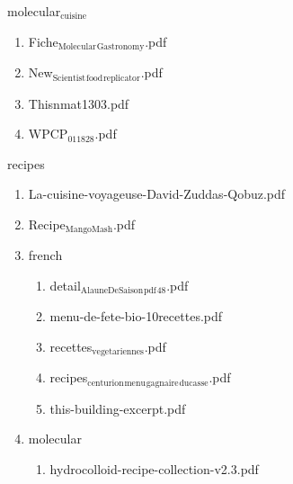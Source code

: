 \documentclass[11pt]{article}
\begin{document}
\item molecular$_{\text{cuisine}}$
\label{sec-1-1-1-1-21-8}
\begin{enumerate}
\item Fiche$_{\text{Molecular}}$$_{\text{Gastronomy}}$.pdf
\label{sec-1-1-1-1-21-8-1}

\item New$_{\text{Scientist}}$$_{\text{food}}$$_{\text{replicator}}$.pdf
\label{sec-1-1-1-1-21-8-2}

\item Thisnmat1303.pdf
\label{sec-1-1-1-1-21-8-3}

\item WPCP$_{\text{011828}}$.pdf
\label{sec-1-1-1-1-21-8-4}
\end{enumerate}

\item recipes
\label{sec-1-1-1-1-21-9}
\begin{enumerate}
\item La-cuisine-voyageuse-David-Zuddas-Qobuz.pdf
\label{sec-1-1-1-1-21-9-1}

\item Recipe$_{\text{MangoMash}}$.pdf
\label{sec-1-1-1-1-21-9-2}

\item french
\label{sec-1-1-1-1-21-9-3}
\begin{enumerate}
\item detail$_{\text{AlauneDeSaison}}$$_{\text{pdf}}$$_{\text{48}}$.pdf
\label{sec-1-1-1-1-21-9-3-1}

\item menu-de-fete-bio-10recettes.pdf
\label{sec-1-1-1-1-21-9-3-2}

\item recettes$_{\text{vegetariennes}}$.pdf
\label{sec-1-1-1-1-21-9-3-3}

\item recipes$_{\text{centurion}}$$_{\text{menu}}$$_{\text{gagnaire}}$$_{\text{ducasse}}$.pdf
\label{sec-1-1-1-1-21-9-3-4}

\item this-building-excerpt.pdf
\label{sec-1-1-1-1-21-9-3-5}
\end{enumerate}

\item molecular
\label{sec-1-1-1-1-21-9-4}
\begin{enumerate}
\item hydrocolloid-recipe-collection-v2.3.pdf
\label{sec-1-1-1-1-21-9-4-1}
\end{enumerate}
\end{enumerate}
\end{document}
